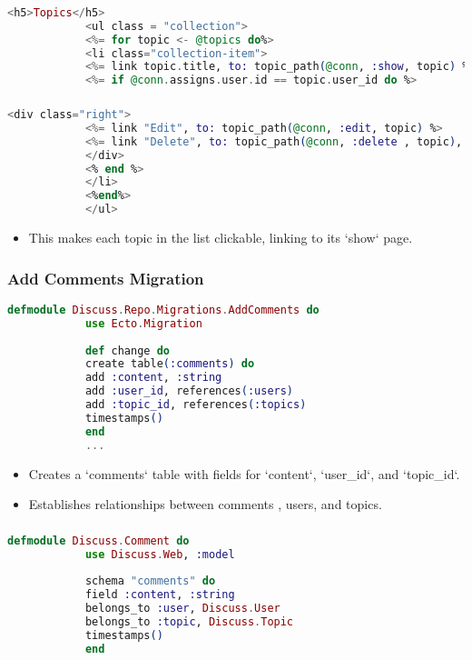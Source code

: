\documentclass[aspectratio=169, table]{beamer}
\begin{document}
	\begin{frame}[fragile]
		\frametitle{}
		\begin{lstlisting}[language=Elixir]
			<h5>Topics</h5>
			<ul class = "collection">
			<%= for topic <- @topics do%>
			<li class="collection-item"> 
			<%= link topic.title, to: topic_path(@conn, :show, topic) %>
			<%= if @conn.assigns.user.id == topic.user_id do %>
		\end{lstlisting}
	\end{frame}
	
	\begin{frame}[fragile]
		\frametitle{}
		\begin{lstlisting}[language=Elixir]
			<div class="right">
			<%= link "Edit", to: topic_path(@conn, :edit, topic) %>
			<%= link "Delete", to: topic_path(@conn, :delete , topic), method: :delete %>
			</div>
			<% end %>
			</li>
			<%end%>
			</ul>
		\end{lstlisting}
		\begin{itemize}
			\item This makes each topic in the list clickable, linking to its `show` page.
		\end{itemize}
	\end{frame}
	
	\begin{frame}[fragile]
		\frametitle{Add Comments Migration}
		\begin{lstlisting}[language=Elixir]
			defmodule Discuss.Repo.Migrations.AddComments do
			use Ecto.Migration
			
			def change do
			create table(:comments) do
			add :content, :string
			add :user_id, references(:users)
			add :topic_id, references(:topics)
			timestamps()
			end
			...
		\end{lstlisting}
		\begin{itemize}
			\item Creates a `comments` table with fields for `content`, `user\_id`, and `topic\_id`.
			\item Establishes relationships between comments , users, and topics.
		\end{itemize}
	\end{frame}
	
	
	\begin{frame}[fragile]
		\frametitle{}
		\begin{lstlisting}[language=Elixir]
			defmodule Discuss.Comment do
			use Discuss.Web, :model
			
			schema "comments" do
			field :content, :string
			belongs_to :user, Discuss.User
			belongs_to :topic, Discuss.Topic
			timestamps()
			end
		\end{lstlisting}
	\end{frame}
	
\end{document}
